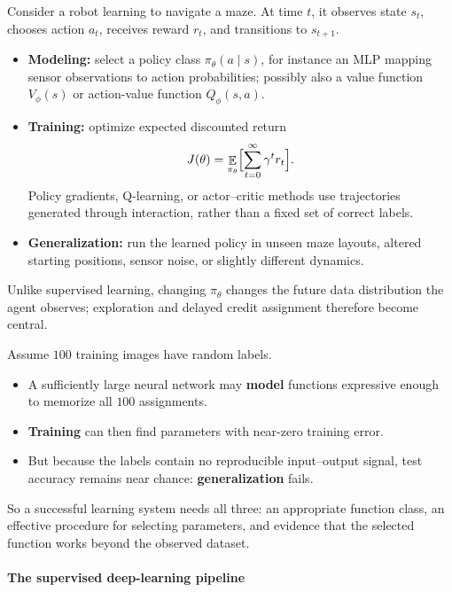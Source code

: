 \documentclass[11pt,a4paper]{article}
\DeclareMathOperator{\E}{\mathbb{E}}
\theoremstyle{definition}
\begin{document}
\begin{example}
Consider a robot learning to navigate a maze. At time $t$, it observes state $s_t$, chooses action $a_t$, receives reward $r_t$, and transitions to $s_{t+1}$.
\begin{itemize}
  \item \textbf{Modeling:} select a policy class $\pi_\theta(a\mid s)$, for instance an MLP mapping sensor observations to action probabilities; possibly also a value function $V_\phi(s)$ or action-value function $Q_\phi(s,a)$.
  \item \textbf{Training:} optimize expected discounted return
  \[
  J(\theta)=\E_{\pi_\theta}\Bigl[\sum_{t=0}^{\infty}\gamma^t r_t\Bigr].
  \]
  Policy gradients, Q-learning, or actor--critic methods use trajectories generated through interaction, rather than a fixed set of correct labels.
  \item \textbf{Generalization:} run the learned policy in unseen maze layouts, altered starting positions, sensor noise, or slightly different dynamics.
\end{itemize}
Unlike supervised learning, changing $\pi_\theta$ changes the future data distribution the agent observes; exploration and delayed credit assignment therefore become central.
\end{example}

\begin{example}
Assume $100$ training images have random labels.
\begin{itemize}
  \item A sufficiently large neural network may \textbf{model} functions expressive enough to memorize all $100$ assignments.
  \item \textbf{Training} can then find parameters with near-zero training error.
  \item But because the labels contain no reproducible input--output signal, test accuracy remains near chance: \textbf{generalization} fails.
\end{itemize}
So a successful learning system needs all three: an appropriate function class, an effective procedure for selecting parameters, and evidence that the selected function works beyond the observed dataset.
\end{example}

\paragraph{The supervised deep-learning pipeline}
\end{document}
